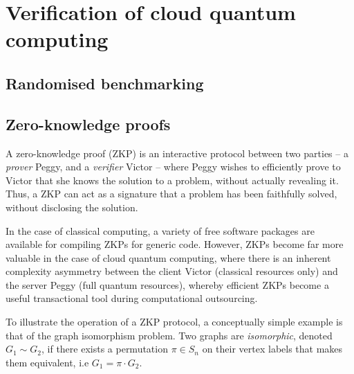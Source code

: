 %
%

\section{Verification of cloud quantum computing} \label{sec:verification}

\subsection{Randomised benchmarking}\label{sec:rand_bench}


\subsection{Zero-knowledge proofs}\label{sec:ZKP}




A zero-knowledge proof (ZKP) is an interactive protocol between two parties -- a \textit{prover} Peggy, and a \textit{verifier} Victor -- where Peggy wishes to efficiently prove to Victor that she knows the solution to a problem, without actually revealing it. Thus, a ZKP can act as a signature that a problem has been faithfully solved, without disclosing the solution.

In the case of classical computing, a variety of free software packages are available for compiling ZKPs for generic code. However, ZKPs become far more valuable in the case of cloud quantum computing, where there is an inherent complexity asymmetry between the client Victor (classical resources only) and the server Peggy (full quantum resources), whereby efficient ZKPs become a useful transactional tool during computational outsourcing.

To illustrate the operation of a ZKP protocol, a conceptually simple example is that of the graph isomorphism problem. Two graphs are \textit{isomorphic}, denoted \mbox{$G_1\sim G_2$}, if there exists a permutation \mbox{$\pi\in S_n$} on their vertex labels that makes them equivalent, i.e \mbox{$G_1=\pi\cdot G_2$}.

